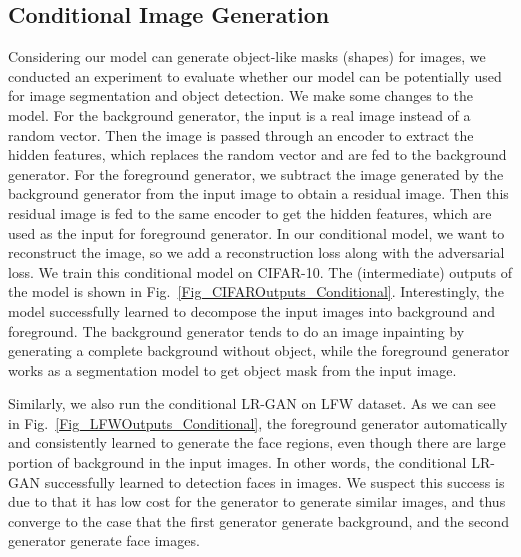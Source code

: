 \documentclass{article} \usepackage{iclr2017_conference,times}
\begin{document}
\subsection{Conditional Image Generation}
Considering our model can generate object-like masks (shapes) for images, we conducted an experiment to evaluate whether our model can be potentially used for image segmentation and object detection. We make some changes to the model. For the background generator, the input is a real image instead of a random vector. Then the image is passed through an encoder to extract the hidden features, which replaces the random vector  and are fed to the background generator. For the foreground generator, we subtract the image generated by the background generator from the input image to obtain a residual image. Then this residual image is fed to the same encoder to get the hidden features, which are used as the input for foreground generator. In our conditional model, we want to reconstruct the image, so we add a reconstruction loss along with the adversarial loss. We train this conditional model on CIFAR-10. The (intermediate) outputs of the model is shown in Fig.~\ref{Fig_CIFAROutputs_Conditional}. Interestingly, the model successfully learned to decompose the input images into background and foreground. The background generator tends to do an image inpainting by generating a complete background without object, while the foreground generator works as a segmentation model to get object mask from the input image.

Similarly, we also run the conditional LR-GAN on LFW dataset. As we can see in Fig.~\ref{Fig_LFWOutputs_Conditional}, the foreground generator automatically and consistently learned to generate the face regions, even though there are large portion of background in the input images. In other words, the conditional LR-GAN successfully learned to detection faces in images. We suspect this success is due to that it has low cost for the generator to generate similar images, and thus converge to the case that the first generator generate background, and the second generator generate face images.
\end{document}
